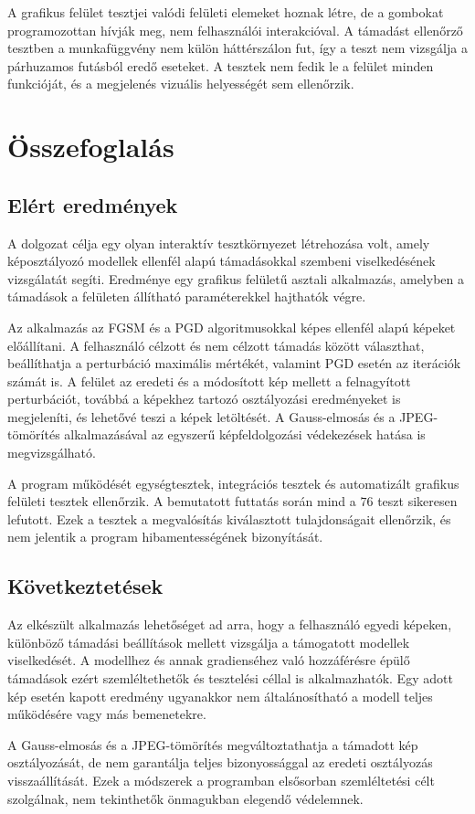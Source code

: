 A grafikus felület tesztjei valódi felületi elemeket hoznak létre, de a gombokat programozottan hívják meg, nem felhasználói 
interakcióval. 
A támadást ellenőrző tesztben a munkafüggvény nem külön háttérszálon fut, így a teszt nem vizsgálja a párhuzamos futásból eredő 
eseteket. 
A tesztek nem fedik le a felület minden funkcióját, és a megjelenés vizuális helyességét sem ellenőrzik. 

\chapter{Összefoglalás}

\section{Elért eredmények}

A dolgozat célja egy olyan interaktív tesztkörnyezet létrehozása volt, amely képosztályozó modellek ellenfél alapú 
támadásokkal szembeni viselkedésének vizsgálatát segíti. 
Eredménye egy grafikus felületű asztali alkalmazás, amelyben a támadások a felületen állítható paraméterekkel 
hajthatók végre. 

Az alkalmazás az FGSM és a PGD algoritmusokkal képes ellenfél alapú képeket előállítani. 
A felhasználó célzott és nem célzott támadás között választhat, beállíthatja a perturbáció maximális mértékét, valamint PGD 
esetén az iterációk számát is. 
A felület az eredeti és a módosított kép mellett a felnagyított perturbációt, továbbá a képekhez tartozó osztályozási 
eredményeket is megjeleníti, és lehetővé teszi a képek letöltését. 
A Gauss-elmosás és a JPEG-tömörítés alkalmazásával az egyszerű képfeldolgozási védekezések hatása is megvizsgálható. 

A program működését egységtesztek, integrációs tesztek és automatizált grafikus felületi tesztek ellenőrzik. 
A bemutatott futtatás során mind a $76$ teszt sikeresen lefutott. 
Ezek a tesztek a megvalósítás kiválasztott tulajdonságait ellenőrzik, és nem jelentik a program hibamentességének bizonyítását. 

\section{Következtetések}

Az elkészült alkalmazás lehetőséget ad arra, hogy a felhasználó egyedi képeken, különböző támadási beállítások mellett 
vizsgálja a támogatott modellek viselkedését. 
A modellhez és annak gradienséhez való hozzáférésre épülő támadások ezért szemléltethetők és tesztelési céllal is 
alkalmazhatók. 
Egy adott kép esetén kapott eredmény ugyanakkor nem általánosítható a modell teljes működésére vagy más bemenetekre. 

A Gauss-elmosás és a JPEG-tömörítés megváltoztathatja a támadott kép osztályozását, de nem garantálja teljes bizonyossággal az 
eredeti osztályozás visszaállítását. 
Ezek a módszerek a programban elsősorban szemléltetési célt szolgálnak, nem tekinthetők önmagukban elegendő védelemnek. 